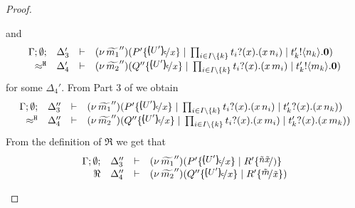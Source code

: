 \begin{proof}
\begin{enumerate}
\begin{enumerate}[i.]
							and
							\begin{eqnarray}
							\mhorel{\Gamma}{\Delta_3'}{  \newsp{\widetilde{m_1}''}{P' \subst{\omapchar{U'}}{x} \Par \prod_{i \in I\backslash{\set{k}}} \binp{t_i}{x} (\appl{x}{n_i}) \Par
									\bout{t'_k}{n_k} \inact}}
							{ \hwb }
							{\Delta_4'}{}{\newsp{\widetilde{m_2}''}{Q'' \subst{\omapchar{U'}}{x} \Par \prod_{i \in I\backslash{\set{k}}} \binp{t_i}{x} (\appl{x}{m_i}) \Par \bout{t'_k}{m_k} \inact}}
							\label{lem:tr_subst_41}
							\end{eqnarray}
							for some $\Delta_4'$.
							From Part 3 of  we obtain
							\begin{eqnarray}
								\mhorel{\Gamma}{\Delta_3''}{  \newsp{\widetilde{m_1}''}{P' \subst{\omapchar{U'}}{x} \Par \prod_{i \in I\backslash{\set{k}}} \binp{t_i}{x} (\appl{x}{n_i}) \Par
								\binp{t'_k}{x} (\appl{x}{n_k})}}
								{ \hwb }
								{\Delta_4''}{}{\newsp{\widetilde{m_2}''}{Q'' \subst{\omapchar{U'}}{x} \Par \prod_{i \in I\backslash{\set{k}}} \binp{t_i}{x} (\appl{x}{m_i}) \Par \binp{t'_k}{x} (\appl{x}{m_k})}}
								\label{lem:tr_subst_442}
							\end{eqnarray}
							From the definition of $\Re$ we get
							that
							\begin{eqnarray*}
							\mhorel{\Gamma}{\Delta_3''}{  \newsp{\widetilde{m_1}''}{P' \subst{\omapchar{U'}}{x} \Par R' \subst{\tilde{n}{\tilde{x}}}}}
							{ \Re }
							{\Delta_4''}{}{\newsp{\widetilde{m_2}''}{Q'' \subst{\omapchar{U'}}{x} \Par R' \subst{\tilde{m}}{\tilde{x}}}}
							\end{eqnarray*}

\end{enumerate}
\end{enumerate}
\end{proof}
